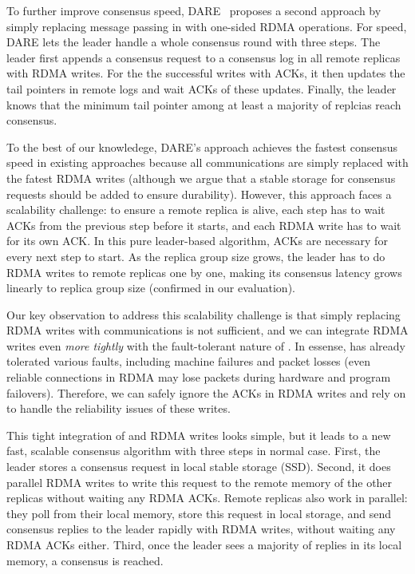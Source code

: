 To further improve consensus speed, DARE~\cite{dare:hpdc15} proposes a second 
approach by simply replacing message passing in \paxos with one-sided RDMA 
operations. For speed, DARE lets the leader handle a whole consensus round
with three steps. The leader first appends a consensus request to a consensus 
log in all remote replicas with RDMA writes. For the the successful writes with 
ACKs, it then updates the tail pointers in remote logs and wait ACKs of these 
updates. Finally, the leader knows that the minimum tail pointer among at 
least a majority of replcias reach consensus.

To the best of our knowledege, DARE's approach achieves the fastest consensus 
speed in existing approaches because all communications are simply replaced 
with the fatest RDMA writes (although we argue that a stable storage for 
consensus requests should be added to ensure \paxos durability). However, this 
approach faces a scalability challenge: to ensure a remote replica is alive, 
each step has to wait ACKs from the previous step before it starts, and each 
RDMA write has to wait for its own ACK. In this pure leader-based algorithm, 
ACKs are necessary for every next step to start. As the replica group size
grows, the leader has to do RDMA writes to remote replicas one by one, making 
its consensus latency grows linearly to replica group size (confirmed in our 
evaluation).

Our key observation to address this scalability challenge is that simply 
replacing RDMA writes with \paxos communications is not sufficient, and we can 
integrate RDMA writes even \emph{more tightly} with the fault-tolerant nature 
of \paxos. In essense, \paxos has already tolerated various faults, including 
machine failures and packet losses (even reliable connections in RDMA may lose 
packets during hardware and program failovers). Therefore, we can safely ignore 
the ACKs in RDMA writes and rely on \paxos to handle the reliability issues of 
these writes.

This tight integration of \paxos and RDMA writes looks simple, but it leads to 
a new fast, scalable \paxos consensus algorithm with three steps in normal 
case. First, the leader stores a consensus request in local stable storage 
(SSD). Second, it does parallel RDMA writes to write this request to the remote 
memory of the other replicas without waiting any RDMA ACKs. Remote replicas 
also work in parallel: they poll from their local memory, store this request in 
local storage, and send consensus replies to the leader rapidly with RDMA 
writes, without waiting any RDMA ACKs either. Third, once the leader sees a 
majority of replies in its local memory, a consensus is reached.


